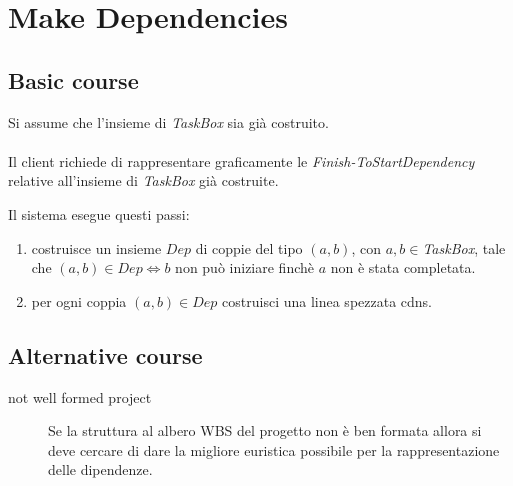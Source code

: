 \section{Make Dependencies}
\label{seq:makeDependencies}
\subsection{Basic course}
Si assume che l'insieme di \emph{TaskBox} sia gi\`a costruito.\\\\
Il client richiede di rappresentare graficamente le
\emph{Finish-ToStartDependency} relative all'insieme di \emph{TaskBox} gi\`a
costruite.

Il sistema esegue questi passi:
\begin{enumerate}
  \item costruisce un insieme $Dep$ di coppie del tipo $(a,b)$, con $a,b \in
  $\emph{TaskBox}, tale che $(a,b) \in Dep \Leftrightarrow b$ non pu\`o
  iniziare finch\`e $a$ non \`e stata completata.
  \item per ogni coppia $(a,b) \in Dep$ costruisci una linea
  spezzata cdns.
\end{enumerate}

\subsection{Alternative course}
\begin{description}
\item[not well formed project] Se la struttura al albero WBS del progetto non
\`e ben formata allora si deve cercare di dare la migliore euristica possibile
per la rappresentazione delle dipendenze.

\end{description}